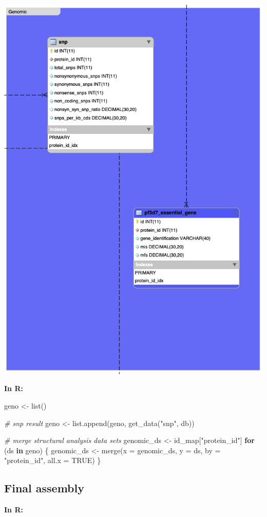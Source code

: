 \documentclass[
  11pt,
  oneside]{book}
\newenvironment{Shaded}{\begin{snugshade}}{\end{snugshade}}
\newcommand{\AttributeTok}[1]{\textcolor[rgb]{0.77,0.63,0.00}{#1}}
\newcommand{\CommentTok}[1]{\textcolor[rgb]{0.56,0.35,0.01}{\textit{#1}}}
\newcommand{\ConstantTok}[1]{\textcolor[rgb]{0.00,0.00,0.00}{#1}}
\newcommand{\ControlFlowTok}[1]{\textcolor[rgb]{0.13,0.29,0.53}{\textbf{#1}}}
\newcommand{\FunctionTok}[1]{\textcolor[rgb]{0.00,0.00,0.00}{#1}}
\newcommand{\NormalTok}[1]{#1}
\newcommand{\OtherTok}[1]{\textcolor[rgb]{0.56,0.35,0.01}{#1}}
\newcommand{\StringTok}[1]{\textcolor[rgb]{0.31,0.60,0.02}{#1}}
\begin{document}
\begin{center}\includegraphics[width=0.4\linewidth]{./figures/Supplementary Fig 1 genomic data} \end{center}

\textbf{In R: }

\begin{Shaded}
\begin{Highlighting}[]
\NormalTok{geno }\OtherTok{\textless{}{-}} \FunctionTok{list}\NormalTok{()}

\CommentTok{\# snp result}
\NormalTok{geno }\OtherTok{\textless{}{-}} \FunctionTok{list.append}\NormalTok{(geno, }\FunctionTok{get\_data}\NormalTok{(}\StringTok{"snp"}\NormalTok{, db))}

\CommentTok{\# merge structural analysis data sets}
\NormalTok{genomic\_ds }\OtherTok{\textless{}{-}}\NormalTok{ id\_map[}\StringTok{"protein\_id"}\NormalTok{]}
\ControlFlowTok{for}\NormalTok{ (ds }\ControlFlowTok{in}\NormalTok{ geno) \{}
\NormalTok{  genomic\_ds }\OtherTok{\textless{}{-}} \FunctionTok{merge}\NormalTok{(}\AttributeTok{x =}\NormalTok{ genomic\_ds, }\AttributeTok{y =}\NormalTok{ ds, }\AttributeTok{by =} \StringTok{"protein\_id"}\NormalTok{, }\AttributeTok{all.x =} \ConstantTok{TRUE}\NormalTok{)}
\NormalTok{\}}
\end{Highlighting}
\end{Shaded}

\hypertarget{final-assembly}{%
\subsection{Final assembly}\label{final-assembly}}

\textbf{In R: }
\end{document}
